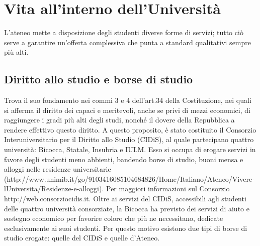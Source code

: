 \section{Vita all'interno dell'Università}
L'ateneo mette a disposizione degli studenti diverse forme di servizi; tutto ciò serve a garantire un'offerta complessiva che punta a standard qualitativi sempre più alti. 

\subsection{Diritto allo studio e borse di studio}
Trova il suo fondamento nei commi 3 e 4 dell'art.34 della Costituzione, nei quali si afferma il diritto dei capaci e meritevoli, anche se privi di mezzi economici, di raggiungere i gradi più alti degli studi, nonché il dovere della Repubblica a rendere effettivo questo diritto. 
A questo proposito, è stato costituito il Consorzio Interuniversitario per il Diritto allo Studio (CIDiS), al quale partecipano quattro università: Bicocca, Statale, Insubria e IULM.  Esso si occupa di erogare servizi in favore degli studenti meno abbienti, bandendo borse di studio, buoni mensa e alloggi nelle residenze universitarie (http://www.unimib.it/go/9103416085104684826/Home/Italiano/Ateneo/Vivere-lUniversita/Residenze-e-alloggi). Per maggiori informazioni sul Consorzio http://web.consorziocidis.it. 
Oltre ai servizi del CIDiS, accessibili agli studenti delle quattro università consorziate, la Bicocca ha previsto dei servizi di aiuto e sostegno economico per favorire coloro che più ne necessitano, dedicate esclusivamente ai suoi studenti. Per questo motivo esistono due tipi di borse di studio erogate: quelle del CIDiS e quelle d'Ateneo. 

